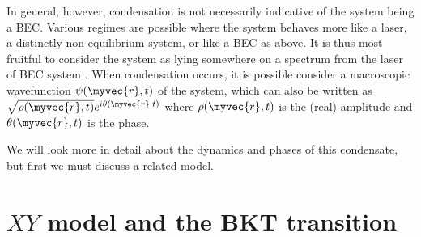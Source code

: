 In general, however, condensation is not necessarily indicative of the system being a BEC. 
Various regimes are possible where the system behaves more like a laser, a distinctly non-equilibrium system, or like a BEC as above.
It is thus most fruitful to consider the system as lying somewhere on a spectrum from the laser of BEC system \cite{Byrnes2014}. When condensation occurs, it is possible consider a macroscopic wavefunction $\psi(\myvec{r},t)$ of the system, which can also be written as $\sqrt{\rho(\myvec{r},t)}e^{i\theta(\myvec{r},t)}$ where $\rho(\myvec{r},t)$ is the (real) amplitude and $\theta(\myvec{r},t)$ is the phase.

We will look more in detail about the dynamics and phases of this condensate, but first we must discuss a related model.


\section{$XY$ model and the BKT transition}

